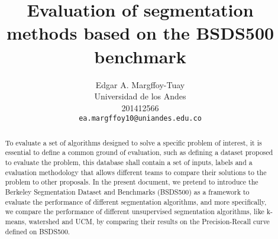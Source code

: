\documentclass[10pt,twocolumn,letterpaper]{article}
\begin{document}
\title{Evaluation of segmentation methods based on the BSDS500 benchmark}

\author{Edgar A. Margffoy-Tuay\\
Universidad de los Andes\\
201412566\\
{\tt\small ea.margffoy10@uniandes.edu.co}
}

\maketitle

\begin{abstract}
To evaluate a set of algorithms designed to solve a specific problem of interest, it is essential to define a common ground of evaluation, such as defining a dataset proposed to evaluate the problem, this database shall contain a set of inputs, labels and a evaluation methodology that allows different teams to compare their solutions to the problem to other proposals. In the present document, we pretend to introduce the Berkeley Segmentation Dataset and Benchmarks (BSDS500) as a framework to evaluate the performance of different segmentation algorithms, and more specifically, we compare the performance of different unsupervised segmentation algorithms, like k-means, watershed and UCM, by comparing their results on the Precision-Recall curve defined on BSDS500.
\end{abstract}

\end{document}
